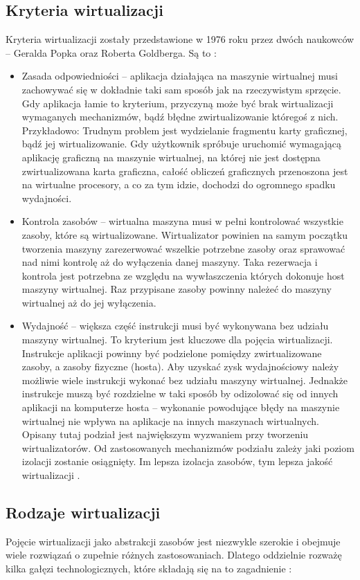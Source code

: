 \documentclass[10pt,a4paper,titlepage,twoside]{report}
\begin{document}
\subsection{Kryteria wirtualizacji}\indent \indent Kryteria wirtualizacji zostały przedstawione w 1976 roku przez dwóch naukowców – Geralda Popka oraz Roberta Goldberga. Są to \cite{ad15}:
\begin{itemize}
	\item Zasada odpowiedniości – aplikacja działająca na maszynie wirtualnej musi zachowywać się w dokładnie taki sam sposób jak na rzeczywistym sprzęcie.
Gdy aplikacja łamie to kryterium, przyczyną może być brak wirtualizacji wymaganych mechanizmów, bądź błędne zwirtualizowanie któregoś z nich. Przykładowo: Trudnym problem jest wydzielanie fragmentu karty graficznej, bądź jej wirtualizowanie. Gdy użytkownik spróbuje uruchomić wymagającą aplikację graficzną na maszynie wirtualnej, na której nie jest dostępna zwirtualizowana karta graficzna, całość obliczeń graficznych przenoszona jest na wirtualne procesory, a co za tym idzie, dochodzi do ogromnego spadku wydajności.
	\item Kontrola zasobów – wirtualna maszyna musi w pełni kontrolować wszystkie zasoby, które są wirtualizowane. Wirtualizator powinien na samym początku tworzenia maszyny zarezerwować wszelkie potrzebne zasoby oraz sprawować nad nimi kontrolę aż do wyłączenia danej maszyny. Taka rezerwacja i kontrola jest potrzebna ze względu na wywłaszczenia których dokonuje host maszyny wirtualnej. Raz przypisane zasoby powinny należeć do maszyny wirtualnej aż do jej wyłączenia.
	\item Wydajność – większa część instrukcji musi być wykonywana bez udziału maszyny wirtualnej.
To kryterium jest kluczowe dla pojęcia wirtualizacji. Instrukcje aplikacji powinny być podzielone pomiędzy zwirtualizowane zasoby, a zasoby fizyczne (hosta). Aby uzyskać zysk wydajnościowy należy możliwie wiele instrukcji wykonać bez udziału maszyny wirtualnej. Jednakże instrukcje muszą być rozdzielne w taki sposób by odizolować się od innych aplikacji na komputerze hosta – wykonanie powodujące błędy na maszynie wirtualnej nie wpływa na aplikacje na innych maszynach wirtualnych. Opisany tutaj podział jest największym wyzwaniem przy tworzeniu wirtualizatorów. Od zastosowanych mechanizmów podziału zależy jaki poziom izolacji zostanie osiągnięty. Im lepsza izolacja zasobów, tym lepsza jakość wirtualizacji \cite{ad17}.
\end{itemize}

\subsection{Rodzaje wirtualizacji}\indent \indent Pojęcie wirtualizacji jako abstrakcji zasobów jest niezwykle szerokie i obejmuje wiele rozwiązań o zupełnie różnych zastosowaniach. Dlatego oddzielnie rozważę kilka gałęzi technologicznych, które składają się na to zagadnienie \cite{ad15}\cite{ad18}:
\end{document}
